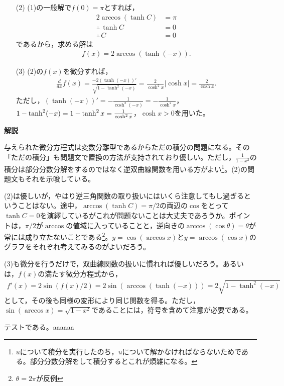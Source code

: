 \documentclass[a4paper,12pt,dvipdfmx,fleqn, oneside]{jsarticle}
\theoremstyle{defstyle}
\theoremstyle{thmx}
\theoremstyle{qesstyle}
\begin{document}
\begin{screen}
    \begin{enumerate}
        \item[(2)] (1)の一般解で$f(0)=\pi$とすれば，
            \begin{align*}
                2\arccos(\tanh C)     & = \pi \\
                \therefore \, \tanh C & =0    \\
                \therefore \, C       & = 0
            \end{align*}
            であるから，求める解は
            \begin{align*}
                f(x)=2\arccos(\tanh (-x)).
            \end{align*}
        \item[(3)] (2)の$f(x)$を微分すれば，
            \begin{align*}
                \frac{d}{dx} f(x) = \frac{-2(\tanh (-x))'}{\sqrt{1-\tanh^2 (-x)}} = \frac{2}{\cosh^2 x} |\cosh x| = \frac{2}{\cosh x}.
            \end{align*}
            ただし，$(\tanh(-x))'=-\frac{1}{\cosh^2 (-x)}=-\frac{1}{\cosh^2 x}$，$1-\tanh^2(-x)=\\1-\tanh^2 x = \frac{1}{\cosh^2 x} $，$\cosh x >0$を用いた。
    \end{enumerate}
\end{screen}

\textbf{解説}

与えられた微分方程式は変数分離型であるからただの積分の問題になる。その「ただの積分」も問題文で置換の方法が支持されており優しい。ただし，$\frac{1}{1-x^2}$の積分は部分分数分解をするのではなく逆双曲線関数を用いる方がよい\footnote{$u$について積分を実行したのち，$u$について解かなければならないためである。部分分数分解をして積分するとこれが煩雑になる。}。(2)の問題文もそれを示唆している。

(2)は優しいが，やはり逆三角関数の取り扱いにはいくら注意してもし過ぎるということはない。途中，$\arccos(\tanh C)=\pi /2$の両辺の$\cos$をとって$\tanh C=0$を演繹しているがこれが問題ないことは大丈夫であろうか。ポイントは，$\pi /2$が$\arccos$の値域に入っていることと，逆向きの$\arccos (\cos \theta) = \theta$が常には成り立たないことである\footnote{$\theta = 2\pi$が反例}。$y=\cos (\arccos x)$と$y = \arccos (\cos x)$のグラフをそれぞれ考えてみるのがよいだろう。

(3)も微分を行うだけで，双曲線関数の扱いに慣れれば優しいだろう。あるいは，$f(x)$の満たす微分方程式から，
\begin{align*}
    f'(x) = 2\sin (f(x)/2)= 2 \sin (\arccos (\tanh (-x))) = 2 \sqrt{1- \tanh^2(-x)}
\end{align*}
として，その後も同様の変形により同じ関数を得る。ただし，$\sin (\arccos x) = \sqrt{1-x^2}$であることには，符号を含めて注意が必要である。
\begin{shadebox}
    テストである。aaaaaa
\end{shadebox}
\end{document}
